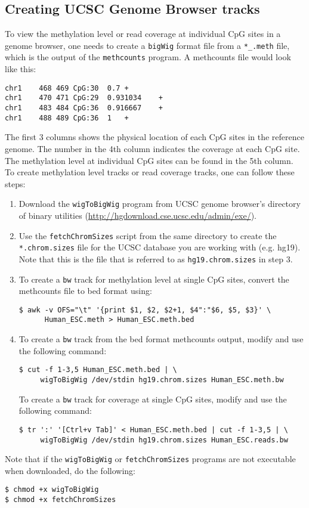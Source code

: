 \documentclass[10pt]{article}
\newcommand{\prog}[1]{\texttt{#1}}
\newcommand{\fn}[1]{\texttt{#1}}
\newcommand{\lit}[1]{\texttt{#1}}
\begin{document}
{{\subsection{Creating UCSC Genome Browser tracks}
\label{sec:browser}

To view the methylation level or read coverage at individual CpG sites
in a genome browser, one needs to create a \lit{bigWig} format file
from a \fn{*\_.meth} file, which is the output of the \prog{methcounts}
program. A methcounts file would look like this:

\begin{verbatim}
chr1	468	469	CpG:30	0.7	+
chr1	470	471	CpG:29	0.931034	+
chr1	483	484	CpG:36	0.916667	+
chr1	488	489	CpG:36	1	+
\end{verbatim}

The first 3 columns shows the physical location of each CpG sites in
the reference genome. The number in the 4th column indicates the
coverage at each CpG site. The methylation level at individual CpG
sites can be found in the 5th column. To create methylation level
tracks or read coverage tracks, one can follow these steps:

\begin{enumerate}
\item Download the \prog{wigToBigWig} program from UCSC genome
  browser's directory of binary utilities
  (\url{http://hgdownload.cse.ucsc.edu/admin/exe/}).
\item Use the \fn{fetchChromSizes} script from the same directory to
  create the \fn{*.chrom.sizes} file for the UCSC database you are
  working with (e.g. hg19). Note that this is the file that is
  referred to as \fn{hg19.chrom.sizes} in step 3.
\item To create a \fn{bw} track for methylation level at single CpG
  sites, convert the methcounts file to bed format using:
\begin{verbatim}
$ awk -v OFS="\t" '{print $1, $2, $2+1, $4":"$6, $5, $3}' \
      Human_ESC.meth > Human_ESC.meth.bed
\end{verbatim}
\item To create a \fn{bw} track from the bed format methcounts output, 
modify and use the following command:
\begin{verbatim}
$ cut -f 1-3,5 Human_ESC.meth.bed | \
     wigToBigWig /dev/stdin hg19.chrom.sizes Human_ESC.meth.bw
\end{verbatim}
  To create a \fn{bw} track for coverage at single CpG sites, modify
  and use the following command:
\begin{verbatim}
$ tr ':' '[Ctrl+v Tab]' < Human_ESC.meth.bed | cut -f 1-3,5 | \
     wigToBigWig /dev/stdin hg19.chrom.sizes Human_ESC.reads.bw
\end{verbatim}
\end{enumerate}
Note that if the \prog{wigToBigWig} or \prog{fetchChromSizes} programs
are not executable when downloaded, do the following:
\begin{verbatim}
$ chmod +x wigToBigWig
$ chmod +x fetchChromSizes
\end{verbatim}

}}
\end{document}
